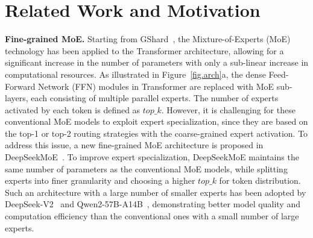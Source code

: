 \section{Related Work and Motivation}
\label{sec:related}

\noindent\textbf{Fine-grained MoE.} 
Starting from GShard~\cite{lepikhin2020gshard}, the Mixture-of-Experts (MoE) technology has been applied to the Transformer architecture, allowing for a significant increase in the number of parameters with only a sub-linear increase in computational resources. 
As illustrated in Figure~\ref{fig.arch}a, the dense Feed-Forward Network (FFN) modules in Transformer are replaced with MoE sub-layers, each consisting of multiple parallel experts. 
The number of experts activated by each token is defined as $top\_k$. 
However, it is challenging for these conventional MoE models to exploit expert specialization, since they are based on the top-1 or top-2 routing strategies with the coarse-grained expert activation. 
To address this issue, a new fine-grained MoE architecture is proposed in DeepSeekMoE~\cite{dai2024deepseekmoeultimateexpertspecialization}. 
To improve expert specialization, DeepSeekMoE maintains the same number of parameters as the conventional MoE models, while splitting experts into finer granularity and choosing a higher $top\_k$ for token distribution. 
Such an architecture with a large number of smaller experts has been adopted by DeepSeek-V2~\cite{deepseekai2024deepseekv2strongeconomicalefficient} and Qwen2-57B-A14B~\cite{yang2024qwen2}, demonstrating better model quality and computation efficiency than the conventional ones with a small number of large experts. 

